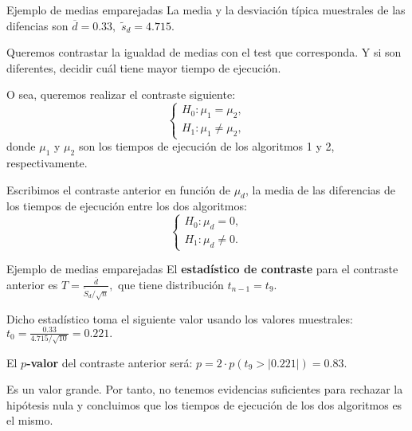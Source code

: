 \documentclass[
  ignorenonframetext,
]{beamer}
\begin{document}
\begin{frame}{Ejemplo de medias emparejadas}
\protect\hypertarget{ejemplo-de-medias-emparejadas-1}{}
La media y la desviación típica muestrales de las difencias son
\(\overline{d}=0.33,\) \(\tilde s_d = 4.715.\)

Queremos contrastar la igualdad de medias con el test que corresponda. Y
si son diferentes, decidir cuál tiene mayor tiempo de ejecución.

O sea, queremos realizar el contraste siguiente: \[
\left\{\begin{array}{l}
H_0:\mu_1=\mu_2,\\
H_1:\mu_1\neq \mu_2,
\end{array}\right.
\] donde \(\mu_1\) y \(\mu_2\) son los tiempos de ejecución de los
algoritmos 1 y 2, respectivamente.

Escribimos el contraste anterior en función de \(\mu_d\), la media de
las diferencias de los tiempos de ejecución entre los dos algoritmos: \[
\left\{\begin{array}{l}
H_0:\mu_d=0,\\
H_1:\mu_d\neq 0.
\end{array}\right.
\]
\end{frame}

\begin{frame}{Ejemplo de medias emparejadas}
\protect\hypertarget{ejemplo-de-medias-emparejadas-2}{}
El \textbf{estadístico de contraste} para el contraste anterior es
\(T=\frac{\overline{d}}{\widetilde{S}_d/\sqrt{n}},\) que tiene
distribución \(t_{n-1}=t_{9}\).

Dicho estadístico toma el siguiente valor usando los valores muestrales:
\(t_0=\frac{0.33}{4.715/\sqrt{10}}=0.221.\)

El \textbf{\(p\)-valor} del contraste anterior será:
\(p=2\cdot p(t_{9} > |0.221|) =0.83.\)

Es un valor grande. Por tanto, no tenemos evidencias suficientes para
rechazar la hipótesis nula y concluimos que los tiempos de ejecución de
los dos algoritmos es el mismo.
\end{frame}
\end{document}
